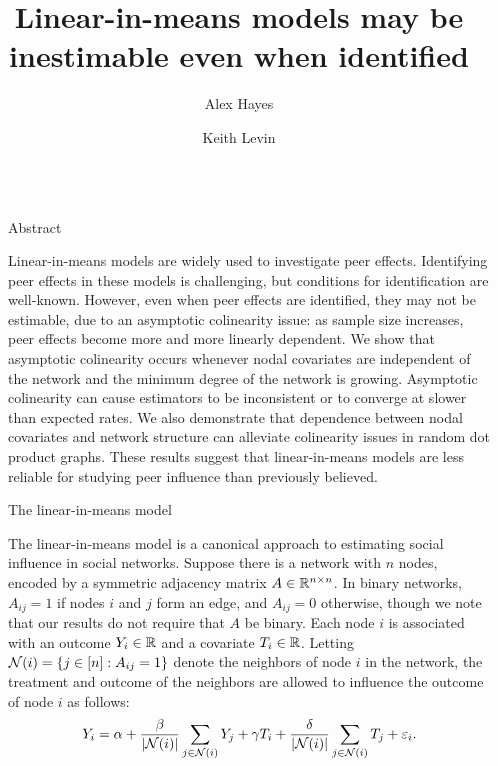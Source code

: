 \documentclass[final]{beamer}
\title{Linear-in-means models may be inestimable even when identified}
\author{Alex Hayes \inst{1} \and Keith Levin \inst{1}}
\institute[shortinst]{\inst{1} Department of Statistics, University of Wisconsin-Madison}
\newlength{\sepwidth}
\newlength{\colwidth}
\newcommand{\separatorcolumn}{\begin{column}{\sepwidth}\end{column}}
\begin{document}
\begin{frame}[t]
    \begin{columns}[t]
        \separatorcolumn

        \begin{column}{\colwidth}

            \begin{alertblock}{Abstract}

                Linear-in-means models are widely used to investigate peer effects. Identifying peer effects in these models is challenging, but conditions for identification are well-known. However, even when peer effects are identified, they may not be estimable, due to an asymptotic colinearity issue: as sample size increases, peer effects become more and more linearly dependent.  We show that asymptotic colinearity occurs whenever nodal covariates are independent of the network and the minimum degree of the network is growing. Asymptotic colinearity can cause estimators to be inconsistent or to converge at slower than expected rates. We also demonstrate that dependence between nodal covariates and network structure can alleviate colinearity issues in random dot product graphs. These results suggest that linear-in-means models are less reliable for studying peer influence than previously believed.

            \end{alertblock}

            \begin{block}{The linear-in-means model}


                The linear-in-means model is a canonical approach to estimating social influence in social networks. Suppose there is a network with $n$ nodes, encoded by a symmetric adjacency matrix $A \in \mathbb{R}^{n \times n}$. In binary networks, $A_{ij} = 1$ if nodes $i$ and $j$ form an edge, and $A_{ij} = 0$ otherwise, though we note that our results do not require that $A$ be binary. Each node $i$ is associated with an outcome $Y_i \in \mathbb{R}$ and a covariate $T_i \in \mathbb{R}$. Letting $\mathcal N(i) = \left\{ j \in [n]: A_{ij} = 1 \right\}$ denote the neighbors of node $i$ in the network, the treatment and outcome of the neighbors are allowed to influence the outcome of node $i$ as follows:
                \begin{equation}
                    \label{eq:lim-avg}
                    Y_i =
                    \alpha +
                    \frac{ \beta }{\lvert\mathcal N(i)\rvert}\sum_{j \in \mathcal N(i)} Y_j +
                    \gamma T_i +
                    \frac{\delta}{\lvert\mathcal N(i)\rvert}\sum_{j \in \mathcal N(i)} T_j +
                    \varepsilon_i.
                \end{equation}


\end{block}
\end{column}
\end{columns}
\end{frame}
\end{document}
